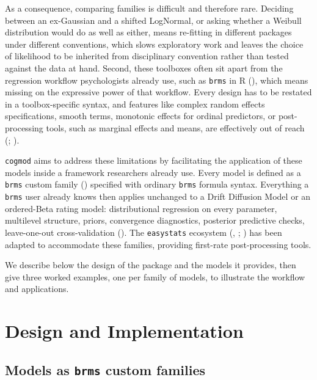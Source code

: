 \documentclass[
  jou,
  floatsintext,
  longtable,
  nolmodern,
  notxfonts,
  notimes,
  12pt,
  colorlinks=true,linkcolor=blue,citecolor=blue,urlcolor=blue]{apa7}
\begin{document}
As a consequence, comparing families is difficult and therefore rare.
Deciding between an ex-Gaussian and a shifted LogNormal, or asking
whether a Weibull distribution would do as well as either, means
re-fitting in different packages under different conventions, which
slows exploratory work and leaves the choice of likelihood to be
inherited from disciplinary convention rather than tested against the
data at hand. Second, these toolboxes often sit apart from the
regression workflow psychologists already use, such as \texttt{brms} in
R (), which means missing
on the expressive power of that workflow. Every design has to be
restated in a toolbox-specific syntax, and features like complex random
effects specifications, smooth terms, monotonic effects for ordinal
predictors, or post-processing tools, such as marginal effects and
means, are effectively out of reach
(;
).

\texttt{cogmod} aims to address these limitations by facilitating the
application of these models inside a framework researchers already use.
Every model is defined as a \texttt{brms} custom family
() specified with ordinary
\texttt{brms} formula syntax. Everything a \texttt{brms} user already
knows then applies unchanged to a Drift Diffusion Model or an
ordered-Beta rating model: distributional regression on every parameter,
multilevel structure, priors, convergence diagnostics, posterior
predictive checks, leave-one-out cross-validation
(). The
\texttt{easystats} ecosystem (, ;
) has been
adapted to accommodate these families, providing first-rate
post-processing tools.

We describe below the design of the package and the models it provides,
then give three worked examples, one per family of models, to illustrate
the workflow and applications.

\section{Design and Implementation}\label{design-and-implementation}

\subsection{\texorpdfstring{Models as \texttt{brms} custom
families}{Models as brms custom families}}\label{models-as-brms-custom-families}
\end{document}
